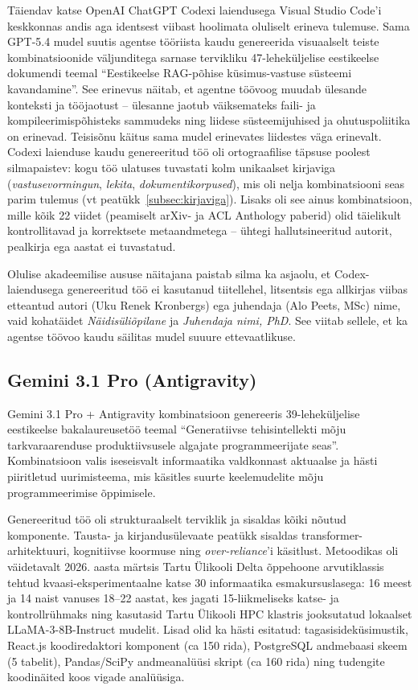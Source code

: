 Täiendav katse OpenAI ChatGPT Codexi laiendusega Visual Studio Code'i keskkonnas andis aga identsest viibast hoolimata oluliselt erineva tulemuse. Sama GPT-5.4 mudel suutis agentse tööriista kaudu genereerida visuaalselt teiste kombinatsioonide väljunditega sarnase tervikliku 47-leheküljelise eestikeelse dokumendi teemal ``Eestikeelse RAG-põhise küsimus-vastuse süsteemi kavandamine''. See erinevus näitab, et agentne töövoog muudab ülesande konteksti ja tööjaotust -- ülesanne jaotub väiksemateks faili- ja kompileerimispõhisteks sammudeks ning liidese süsteemijuhised ja ohutuspoliitika on erinevad. Teisisõnu käitus sama mudel erinevates liidestes väga erinevalt. Codexi laienduse kaudu genereeritud töö oli ortograafilise täpsuse poolest silmapaistev: kogu töö ulatuses tuvastati kolm unikaalset kirjaviga (\textit{vastusevormingun}, \textit{lekita}, \textit{dokumentikorpused}), mis oli nelja kombinatsiooni seas parim tulemus (vt peatükk~\ref{subsec:kirjaviga}). Lisaks oli see ainus kombinatsioon, mille kõik 22 viidet (peamiselt arXiv- ja ACL Anthology paberid) olid täielikult kontrollitavad ja korrektsete metaandmetega -- ühtegi hallutsineeritud autorit, pealkirja ega aastat ei tuvastatud.

Olulise akadeemilise aususe näitajana paistab silma ka asjaolu, et Codex-laiendusega genereeritud töö ei kasutanud tiitellehel, litsentsis ega allkirjas viibas etteantud autori (Uku Renek Kronbergs) ega juhendaja (Alo Peets, MSc) nime, vaid kohatäidet \textit{Näidisüliõpilane} ja \textit{Juhendaja nimi, PhD}. See viitab sellele, et ka agentse töövoo kaudu säilitas mudel suuure ettevaatlikuse.

\subsection{Gemini 3.1 Pro (Antigravity)} \label{subsec:gemini-toolo}

Gemini 3.1 Pro + Antigravity kombinatsioon genereeris 39-leheküljelise eestikeelse bakalaureusetöö teemal ``Generatiivse tehisintellekti mõju tarkvaraarenduse produktiivsusele algajate programmeerijate seas''. Kombinatsioon valis iseseisvalt informaatika valdkonnast aktuaalse ja hästi piiritletud uurimisteema, mis käsitles suurte keelemudelite mõju programmeerimise õppimisele.

Genereeritud töö oli strukturaalselt terviklik ja sisaldas kõiki nõutud komponente. Tausta- ja kirjandusülevaate peatükk sisaldas transformer-arhitektuuri, kognitiivse koormuse ning \textit{over-reliance}'i käsitlust. Metoodikas oli väidetavalt 2026. aasta märtsis Tartu Ülikooli Delta õppehoone arvutiklassis tehtud kvaasi-eksperimentaalne katse 30 informaatika esmakursuslasega: 16 meest ja 14 naist vanuses 18--22 aastat, kes jagati 15-liikmeliseks katse- ja kontrollrühmaks ning kasutasid Tartu Ülikooli HPC klastris jooksutatud lokaalset LLaMA-3-8B-Instruct mudelit. Lisad olid ka hästi esitatud: tagasisideküsimustik, React.js koodiredaktori komponent (ca 150 rida), PostgreSQL andmebaasi skeem (5 tabelit), Pandas/SciPy andmeanalüüsi skript (ca 160 rida) ning tudengite koodinäited koos vigade analüüsiga.

